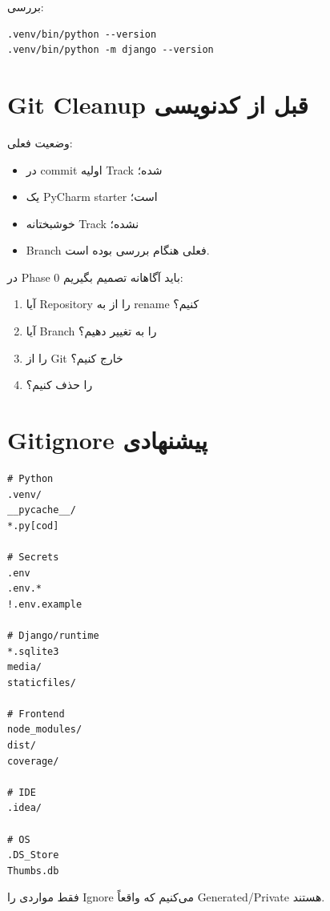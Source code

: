 بررسی:
\begin{latin}
\begin{lstlisting}
.venv/bin/python --version
.venv/bin/python -m django --version
\end{lstlisting}
\end{latin}

\section{Git Cleanup قبل از کدنویسی}

وضعیت فعلی:
\begin{itemize}
  \item {} در commit اولیه Track شده؛
  \item {} یک PyCharm starter است؛
  \item {} خوشبختانه Track نشده؛
  \item Branch فعلی هنگام بررسی  بوده است.
\end{itemize}

در Phase 0 باید آگاهانه تصمیم بگیریم:
\begin{enumerate}
  \item آیا Repository را از  به  rename کنیم؟
  \item آیا Branch را به  تغییر دهیم؟
  \item {} را از Git خارج کنیم؟
  \item {} را حذف کنیم؟
\end{enumerate}

\section{Gitignore پیشنهادی}

\begin{latin}
\begin{lstlisting}
# Python
.venv/
__pycache__/
*.py[cod]

# Secrets
.env
.env.*
!.env.example

# Django/runtime
*.sqlite3
media/
staticfiles/

# Frontend
node_modules/
dist/
coverage/

# IDE
.idea/

# OS
.DS_Store
Thumbs.db
\end{lstlisting}
\end{latin}

فقط مواردی را Ignore می‌کنیم که واقعاً Generated/Private هستند.

